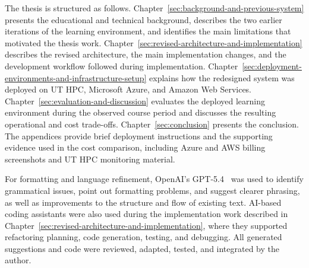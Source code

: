 The thesis is structured as follows.
Chapter~\ref{sec:background-and-previous-system} presents the educational and technical background, describes the two earlier iterations of the learning environment, and identifies the main limitations that motivated the thesis work.
Chapter~\ref{sec:revised-architecture-and-implementation} describes the revised architecture, the main implementation changes, and the development workflow followed during implementation.
Chapter~\ref{sec:deployment-environments-and-infrastructure-setup} explains how the redesigned system was deployed on UT HPC, Microsoft Azure, and Amazon Web Services.
Chapter~\ref{sec:evaluation-and-discussion} evaluates the deployed learning environment during the observed course period and discusses the resulting operational and cost trade-offs.
Chapter~\ref{sec:conclusion} presents the conclusion.
The appendices provide brief deployment instructions and the supporting evidence used in the cost comparison, including Azure and AWS billing screenshots and UT HPC monitoring material.

For formatting and language refinement, OpenAI's GPT-5.4~\cite{openai_gpt_5_4_2026} was used to identify grammatical issues, point out formatting problems, and suggest clearer phrasing, as well as improvements to the structure and flow of existing text.
AI-based coding assistants were also used during the implementation work described in Chapter~\ref{sec:revised-architecture-and-implementation}, where they supported refactoring planning, code generation, testing, and debugging.
All generated suggestions and code were reviewed, adapted, tested, and integrated by the author.
